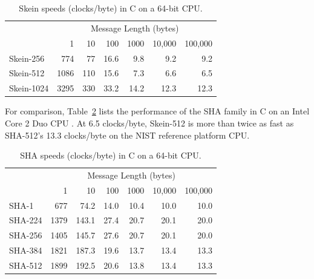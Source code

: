 \documentclass[11pt,twoside]{article}
\begin{document}
\begin{table}[htb]
  \begin{center}
    \begin{tabular}{|l|rrrrrr|}
    \hline
    & \multicolumn{6}{c|}{Message Length (bytes)}\\
               &    1 &   10 &  100 & 1000 & 10,000 & 100,000 \\
    \hline
    Skein-256  &  774 &   77 & 16.6 &  9.8 &    9.2 &   9.2 \\
    Skein-512  & 1086 &  110 & 15.6 &  7.3 &    6.6 &   6.5 \\
    Skein-1024 & 3295 &  330 & 33.2 & 14.2 &   12.3 &  12.3 \\
    \hline
    \end{tabular}
   \end{center}\caption{Skein speeds (clocks/byte) in C on a 64-bit CPU.}
  \label{tab:SkeinC64Speed}
\end{table}

For comparison, Table~\ref{tab:SHAC64Speed} lists the performance of the SHA family in C on an Intel Core 2 Duo CPU \cite{G08a,G08b}.  At 6.5 clocks/byte, Skein-512 is more than twice as fast as SHA-512's 13.3 clocks/byte on the NIST reference platform CPU.
%
\begin{table}[htb]
  \begin{center}
    \begin{tabular}{|l|rrrrrr|}
    \hline
    & \multicolumn{6}{c|}{Message Length (bytes)} \\
      & 1 & 10 &  100 & 1000 & 10,000 & 100,000   \\
    \hline
    SHA-1   &  677 &  74.2 & 14.0 & 10.4 & 10.0 & 10.0 \\
    SHA-224 & 1379 & 143.1 & 27.4 & 20.7 & 20.1 & 20.0 \\
    SHA-256 & 1405 & 145.7 & 27.6 & 20.7 & 20.1 & 20.0 \\
    SHA-384 & 1821 & 187.3 & 19.6 & 13.7 & 13.4 & 13.3 \\
    SHA-512 & 1899 & 192.5 & 20.6 & 13.8 & 13.4 & 13.3 \\
    \hline
    \end{tabular}
   \end{center}\caption{SHA speeds (clocks/byte) in C on a 64-bit CPU.}
  \label{tab:SHAC64Speed}
\end{table}
\end{document}
